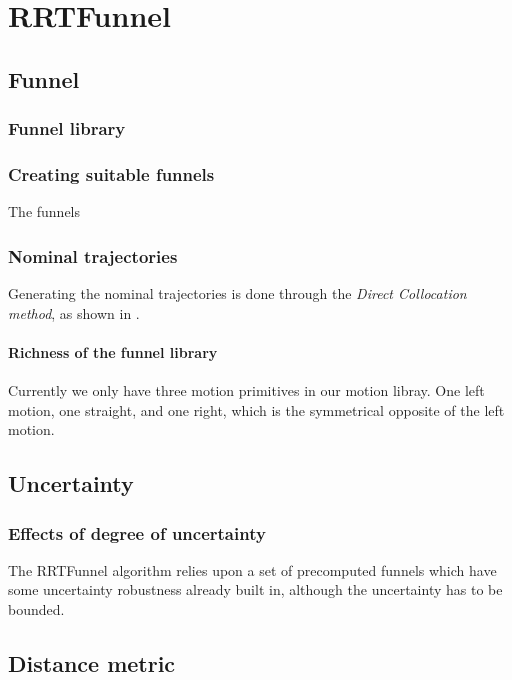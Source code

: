 \chapter{RRTFunnel}

\section{Funnel}

\subsection{Funnel library}

\subsection{Creating suitable funnels}

The funnels

\subsection{Nominal trajectories}

Generating the nominal trajectories is done through the \textit{Direct
  Collocation method}, as shown in \cite{DirectCollocation paper}.

\subsubsection{Richness of the funnel library}

Currently we only have three motion primitives in our motion libray. One left
motion, one straight, and one right, which is the symmetrical opposite of the
left motion. 

\section{Uncertainty}

\subsection{Effects of degree of uncertainty}

The RRTFunnel algorithm relies upon a set of precomputed funnels which have some
uncertainty robustness already built in, although the uncertainty has to be bounded.

\section{Distance metric}

